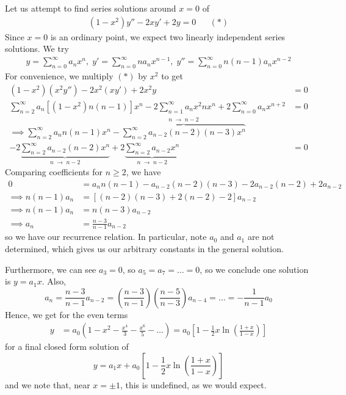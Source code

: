 \documentclass{../../template/note}
\begin{document}
    \begin{example}
        Let us attempt to find series solutions around \(x=0\) of
        \begin{align*}
            (1-x^2)y'' - 2xy' + 2y = 0 && (*)
        \end{align*}
        Since \(x=0\) is an ordinary point, we expect two linearly independent series solutions. We try
        \begin{align*}
            y = \sum_{n=0}^\infty a_n x^n, \;y' = \sum_{n=0}^\infty na_n x^{n-1}, \; y'' = \sum_{n=0}^\infty n(n-1) a_n x^{n-2}
        \end{align*}
        For convenience, we multiply \((*)\) by \(x^2\) to get
        \begin{align*}
            (1-x^2)(x^2y'') -2x^2(xy') + 2x^2y &= 0 \\
            \sum_{n=2}^\infty a_n \left[(1-x^2)n(n-1)\right]x^n - 2 \sum_{n=1}^\infty a_nx^2 nx^n + 2 \sum_{n=0}^\infty a_nx^{n+2} &= 0 \\
            \implies \sum_{n=2}^\infty a_n n(n-1)x^n - \overbrace{\sum_{n=2}^\infty a_{n-2}(n-2)(n-3)x^n}^{n \;\to\; n-2} \\ - 2 \underbrace{\sum_{n=2}^\infty a_{n-2}(n-2)x^n}_{n \;\to\; n-2} + 2\underbrace{\sum_{n=2}^\infty a_{n-2}x^n}_{n \;\to\; n-2} &= 0 
        \end{align*}
        Comparing coefficients for \(n \geq 2\), we have
        \begin{align*}
            0 &= a_nn(n-1) - a_{n-2}(n-2)(n-3) - 2a_{n-2}(n-2) + 2a_{n-2} \\
            \implies n(n-1)a_n &= \left[(n-2)(n-3) + 2(n-2) - 2\right]a_{n-2} \\
            \implies n(n-1)a_n &= n(n-3)a_{n-2} \\
            \implies a_n &= \frac{n-3}{n-1} a_{n-2}
        \end{align*}
        so we have our recurrence relation. In particular, note \(a_0\) and \(a_1\) are not determined, which gives us our arbitrary constants in the general solution.

        Furthermore, we can see \(a_3 = 0\), so \(a_5 = a_7 = \dots = 0\), so we conclude one solution is \(y=a_1x\). Also,
        \[
            a_n = \frac{n-3}{n-1}a_{n-2} = \left(\frac{n-3}{n-1}\right)\left(\frac{n-5}{n-3}\right)a_{n-4} = \dots = -\frac{1}{n-1}a_0
        \]
        Hence, we get for the even terms
        \begin{align*}
            y &= a_0\left(1-x^2-\frac{x^4}{3}-\frac{x^6}{5}-\dots\right) = a_0\left[1-\frac{1}{2}x\ln\left(\frac{1+x}{1-x}\right)\right]
        \end{align*}
        for a final closed form solution of
        \[
            y = a_1x + a_0\left[1-\frac{1}{2}x\ln\left(\frac{1+x}{1-x}\right)\right]
        \]
        and we note that, near \(x = \pm 1\), this is undefined, as we would expect.
        
    \end{example}
\end{document}
